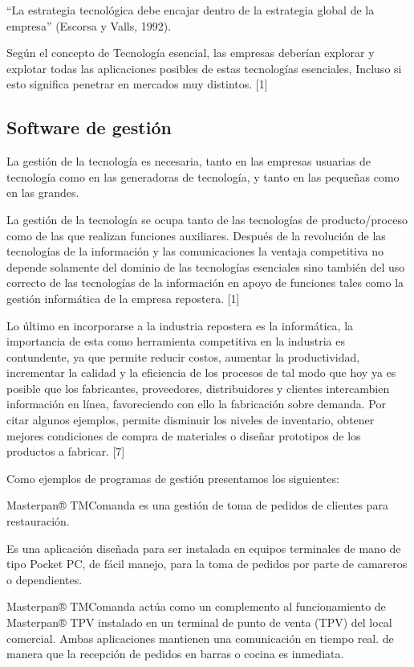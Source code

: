 \documentclass{bmcart}
\begin{document}
“La estrategia tecnológica debe encajar dentro de la estrategia global de la empresa” (Escorsa y Valls, 1992).

Según el concepto de Tecnología esencial, las empresas deberían explorar y explotar todas las aplicaciones posibles de estas tecnologías esenciales, Incluso si esto significa penetrar en mercados muy distintos. [1]


\subsection{Software de gestión}


La gestión de la tecnología es necesaria, tanto en las empresas usuarias de tecnología como en las generadoras de tecnología, y tanto en las pequeñas como en las grandes. 

La gestión de la tecnología se ocupa tanto de las tecnologías de producto/proceso como de las que realizan funciones auxiliares. Después de la revolución de las tecnologías de la información y las comunicaciones la ventaja competitiva no depende solamente del dominio de las tecnologías esenciales sino también del uso correcto de las tecnologías de la información en apoyo de funciones tales como la gestión informática de la empresa repostera. [1]

Lo último en incorporarse a la industria repostera es la informática, la importancia de esta como herramienta competitiva en la industria es contundente, ya que permite reducir costos, aumentar la productividad, incrementar la calidad y la eficiencia de los procesos de tal modo que hoy ya es posible que los fabricantes, proveedores, distribuidores y clientes intercambien información en línea, favoreciendo con ello la fabricación sobre demanda.
Por citar algunos ejemplos, permite disminuir los niveles de inventario, obtener mejores condiciones de compra de materiales o diseñar prototipos de los productos a fabricar. [7]

Como ejemplos de programas de gestión presentamos los siguientes:

Masterpan® TMComanda es una gestión de toma de pedidos de clientes para restauración.

Es una aplicación diseñada para ser instalada en equipos terminales de mano de tipo Pocket PC, de fácil manejo, para la toma de pedidos por parte de camareros o dependientes.

Masterpan® TMComanda actúa como un complemento al funcionamiento de Masterpan® TPV instalado en un terminal de punto de venta (TPV) del local comercial. Ambas aplicaciones mantienen una comunicación en tiempo real. de manera que la recepción de pedidos en barras o cocina es inmediata.
\end{document}
